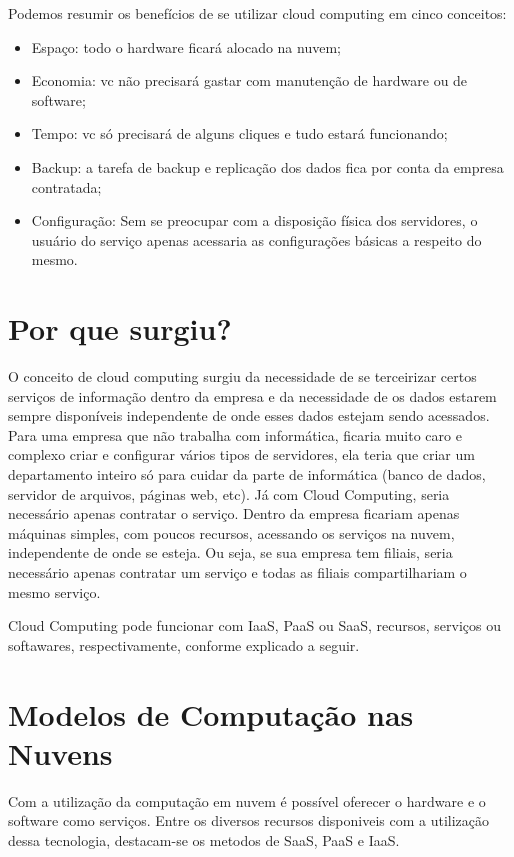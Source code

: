 \documentclass{abnt}
\begin{document}
Podemos resumir os benefícios de se utilizar cloud computing em cinco conceitos:
    \begin{itemize}
        \item Espaço: todo o hardware ficará alocado na nuvem;
        \item Economia: vc não precisará gastar com manutenção de hardware ou de software;
        \item Tempo: vc só precisará de alguns cliques e tudo estará funcionando;
        \item Backup: a tarefa de backup e replicação dos dados fica por conta da empresa contratada;
        \item Configuração: Sem se preocupar com a disposição física dos servidores, o usuário do serviço apenas acessaria as configurações básicas a respeito do mesmo.
    \end{itemize}

	\chapter{Por que surgiu?}
O conceito de cloud computing surgiu da necessidade de se terceirizar certos serviços de informação dentro da empresa e da necessidade de os dados estarem sempre disponíveis independente de onde esses dados estejam sendo acessados. Para uma empresa que não trabalha com informática, ficaria muito caro e complexo criar e configurar vários tipos de servidores, ela teria que criar um departamento inteiro só para cuidar da parte de informática (banco de dados, servidor de arquivos, páginas web, etc). Já com Cloud Computing, seria necessário apenas contratar o serviço. Dentro da empresa ficariam apenas máquinas simples, com poucos recursos, acessando os serviços na nuvem, independente de onde se esteja. Ou seja, se sua empresa tem filiais, seria necessário apenas contratar um serviço e todas as filiais compartilhariam o mesmo serviço. 

Cloud Computing pode funcionar com IaaS, PaaS ou SaaS, recursos, serviços ou softawares, respectivamente, conforme explicado a seguir.
	\chapter{Modelos de Computação nas Nuvens}

	Com a utilização da computação em nuvem é possível oferecer o 
	hardware e o software como serviços. 
	Entre os diversos recursos disponiveis com a utilização dessa tecnologia, 
	destacam-se os metodos de SaaS, PaaS e IaaS.
\end{document}
